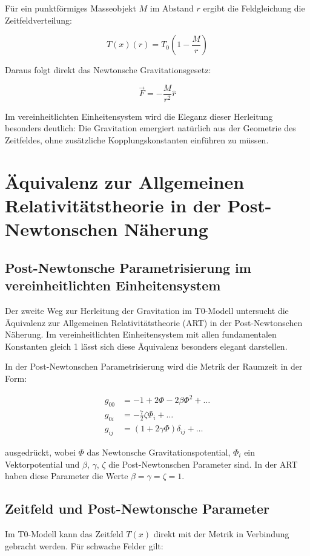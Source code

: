 \documentclass[12pt,a4paper]{article}
\newcommand{\Tfield}{T(x)}
\newcommand{\Tzero}{T_0}
\begin{document}
	Für ein punktförmiges Masseobjekt \(M\) im Abstand \(r\) ergibt die Feldgleichung die Zeitfeldverteilung:
	
	\begin{equation}
		\Tfield(r) = \Tzero\left(1 - \frac{M}{r}\right)
	\end{equation}
	
	Daraus folgt direkt das Newtonsche Gravitationsgesetz:
	
	\begin{equation}
		\vec{F} = -\frac{M}{r^2} \hat{r}
	\end{equation}
	
	Im vereinheitlichten Einheitensystem wird die Eleganz dieser Herleitung besonders deutlich: Die Gravitation emergiert natürlich aus der Geometrie des Zeitfeldes, ohne zusätzliche Kopplungskonstanten einführen zu müssen.
	
	\section{Äquivalenz zur Allgemeinen Relativitätstheorie in der Post-Newtonschen Näherung}
	
	\subsection{Post-Newtonsche Parametrisierung im vereinheitlichten Einheitensystem}
	Der zweite Weg zur Herleitung der Gravitation im T0-Modell untersucht die Äquivalenz zur Allgemeinen Relativitätstheorie (ART) in der Post-Newtonschen Näherung. Im vereinheitlichten Einheitensystem mit allen fundamentalen Konstanten gleich 1 lässt sich diese Äquivalenz besonders elegant darstellen.
	
	In der Post-Newtonschen Parametrisierung wird die Metrik der Raumzeit in der Form:
	
	\begin{align}
		g_{00} &= -1 + 2\Phi - 2\beta\Phi^2 + \dots \\
		g_{0i} &= -\frac{7}{2}\zeta \Phi_i + \dots \\
		g_{ij} &= (1 + 2\gamma\Phi)\delta_{ij} + \dots
	\end{align}
	
	ausgedrückt, wobei \(\Phi\) das Newtonsche Gravitationspotential, \(\Phi_i\) ein Vektorpotential und \(\beta\), \(\gamma\), \(\zeta\) die Post-Newtonschen Parameter sind. In der ART haben diese Parameter die Werte \(\beta = \gamma = \zeta = 1\).
	
	\subsection{Zeitfeld und Post-Newtonsche Parameter}
	Im T0-Modell kann das Zeitfeld \(\Tfield\) direkt mit der Metrik in Verbindung gebracht werden. Für schwache Felder gilt:
	
\end{document}
